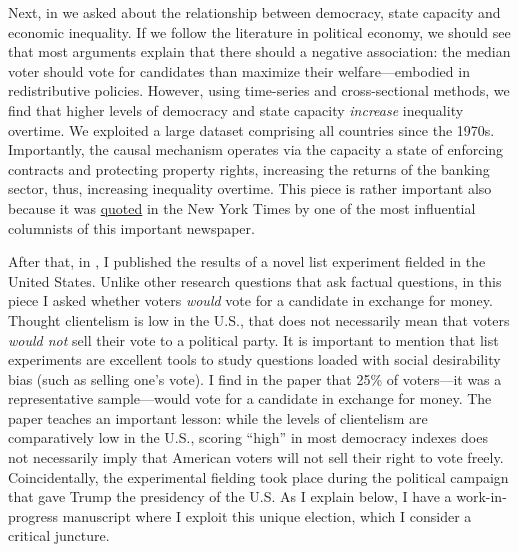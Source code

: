 \documentclass[10pt,stdletter,dateno,sigleft]{newlfm} %
\begin{document}
\begin{newlfm}
Next, in \href{https://doi.org/10.1016/j.ejpoleco.2021.102048}{\textcite{Bahamonde2021a}} we asked about the relationship between democracy, state capacity and economic inequality. If we follow the literature in political economy, we should see that most arguments explain that there should a negative association: the median voter should vote for candidates than maximize their welfare---embodied in redistributive policies. However, using time-series and cross-sectional methods, we find that higher levels of democracy and state capacity \emph{increase} inequality overtime. We exploited a large dataset comprising all countries since the 1970s. Importantly, the causal mechanism operates via the capacity a state of enforcing contracts and protecting property rights, increasing the returns of the banking sector, thus, increasing inequality overtime. This piece is rather important also because it was \href{https://www.nytimes.com/2021/08/04/opinion/biden-eviction-covid-democrats.html}{quoted} in the New York Times by one of the most influential columnists of this important newspaper.

After that, in \href{https://link.springer.com/article/10.1057/s41269-020-00174-4}{\textcite{Bahamonde2020a}}, I published the results of a novel list experiment fielded in the United States. Unlike other research questions that ask factual questions, in this piece I asked whether voters \emph{would} vote for a candidate in exchange for money. Thought clientelism is low in the U.S., that does not necessarily mean that voters \emph{would not} sell their vote to a political party. It is important to mention that list experiments are excellent tools to study questions loaded with social desirability bias (such as selling one's vote). I find in the paper that 25\% of voters---it was a representative sample---would vote for a candidate in exchange for money. The paper teaches an important lesson: while the levels of clientelism are comparatively low in the U.S., scoring ``high'' in most democracy indexes does not necessarily imply that American voters will not sell their right to vote freely. Coincidentally, the experimental fielding took place during the political campaign that gave Trump the presidency of the U.S. As I explain below, I have a work-in-progress manuscript where I exploit this unique election, which I consider a critical juncture.  



\end{newlfm}
\end{document}
